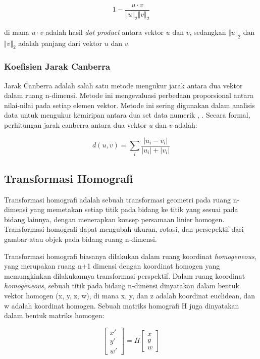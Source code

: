 \begin{equation}
	1-\frac{u\cdot v}{\Vert u\Vert_2\Vert v\Vert_2}
\end{equation}

\noindent di mana $u\cdot v$ adalah hasil \emph{dot product} antara vektor $u$ dan $v$, sedangkan $\Vert u\Vert_2$ dan $\Vert v\Vert_2$ adalah panjang dari vektor $u$ dan $v$.

\subsubsection{Koefisien Jarak Canberra}
Jarak Canberra adalah salah satu metode mengukur jarak antara dua vektor dalam ruang n-dimensi. Metode ini mengevaluasi perbedaan proporsional antara nilai-nilai pada setiap elemen vektor. Metode ini sering digunakan dalam analisis data untuk mengukur kemiripan antara dua set data numerik \cite{clusteringSumayiaAlAnazi}, \cite{sneath1973numerical}. Secara formal, perhitungan jarak canberra antara dua vektor $u$ dan $v$ adalah:

\begin{equation}
	d(u,v)=\sum_i\frac{\left | u_i-v_i \right |}{\left | u_i \right |+\left | v_i \right |}
\end{equation}

\subsection{Transformasi Homografi}
Transformasi homografi adalah sebuah transformasi geometri pada ruang n-dimensi yang memetakan setiap titik pada bidang ke titik yang sesuai pada bidang lainnya, dengan menerapkan konsep persamaan linier homogen. Transformasi homografi dapat mengubah ukuran, rotasi, dan persepektif dari gambar atau objek pada bidang ruang n-dimensi.

Transformasi homografi biasanya dilakukan dalam ruang koordinat \emph{homogeneous}, yang merupakan ruang n+1 dimensi dengan koordinat homogen yang memungkinkan dilakukannya transformasi perspektif. Dalam ruang koordinat \emph{homogeneous}, sebuah titik pada bidang n-dimensi dinyatakan dalam bentuk vektor homogen (x, y, z, w), di mana x, y, dan z adalah koordinat euclidean, dan w adalah koordinat homogen. Sebuah matriks homografi H juga dinyatakan dalam bentuk matriks homogen:

\begin{equation}
	\begin{bmatrix}
		x'\\ 
		y'\\ 
		w'
		\end{bmatrix}=H\begin{bmatrix} 
		x\\ 
		y\\ 
		w
		\end{bmatrix}
\end{equation}

